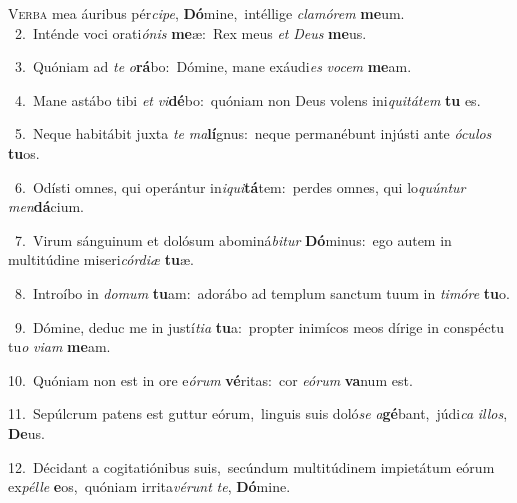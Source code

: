 \lettrine{\initial\textcolor{\initialcolor}{V}}{erba} mea áuribus pér\-\textit{ci}\-\textit{pe}, \textbf{Dó}\-mine,~\star intéllige \textit{cla}\-\textit{mó}\textit{rem} \textbf{me}\-um.\\
{\numbfont\textcolor{\numbcolor}{~2.}}~Inténde voci orati\-\textit{ó}\-\textit{nis} \textbf{me}\-æ:~\star Rex meus \textit{et} \textit{De}\-\textit{us} \textbf{me}\-us.\par
{\numbfont\textcolor{\numbcolor}{~3.}}~Quóniam ad \textit{te} \textit{o}\-\textbf{rá}bo:~\star Dómine, mane exáudi\textit{es} \textit{vo}\-\textit{cem} \textbf{me}\-am.\par
{\numbfont\textcolor{\numbcolor}{~4.}}~Mane astábo tibi \textit{et} \textit{vi}\-\textbf{dé}bo:~\star quóniam non Deus volens ini\-\textit{qui}\-\textit{tá}\textit{tem} \textbf{tu} es.\par
{\numbfont\textcolor{\numbcolor}{~5.}}~Neque habitábit juxta \textit{te} \textit{ma}\-\textbf{lí}gnus:~\star neque permanébunt injústi ante \textit{ó}\-\textit{cu}\textit{los} \textbf{tu}\-os.\par
{\numbfont\textcolor{\numbcolor}{~6.}}~Odísti omnes, qui operántur in\-\textit{i}\-\textit{qui}\textbf{tá}tem:~\star perdes omnes, qui lo\-\textit{quún}\-\textit{tur} \textit{men}\-\textbf{dá}cium.\par
{\numbfont\textcolor{\numbcolor}{~7.}}~Virum sánguinum et dolósum abominá\-\textit{bi}\-\textit{tur} \textbf{Dó}\-minus:~\star ego autem in multitúdine miseri\-\textit{cór}\-\textit{di}\textit{æ} \textbf{tu}\-æ.\par
{\numbfont\textcolor{\numbcolor}{~8.}}~Introíbo in \textit{do}\-\textit{mum} \textbf{tu}\-am:~\star adorábo ad templum sanctum tuum in \textit{ti}\-\textit{mó}\textit{re} \textbf{tu}\-o.\par
{\numbfont\textcolor{\numbcolor}{~9.}}~Dómine, deduc me in justí\-\textit{ti}\-\textit{a} \textbf{tu}\-a:~\star propter inimícos meos dírige in conspéctu tu\textit{o} \textit{vi}\-\textit{am} \textbf{me}\-am.\par
{\numbfont\textcolor{\numbcolor}{10.}}~Quóniam non est in ore e\-\textit{ó}\-\textit{rum} \textbf{vé}\-ritas:~\star cor \textit{e}\-\textit{ó}\textit{rum} \textbf{va}\-num est.\par
{\numbfont\textcolor{\numbcolor}{11.}}~Sepúlcrum patens est guttur eórum,~\dagger linguis suis doló\textit{se} \textit{a}\-\textbf{gé}bant,~\star júdi\textit{ca} \textit{il}\-\textit{los}, \textbf{De}\-us.\par
{\numbfont\textcolor{\numbcolor}{12.}}~Décidant a cogitatiónibus suis,~\dagger secúndum multitúdinem impietátum eórum ex\-\textit{pél}\-\textit{le} \textbf{e}\-os,~\star quóniam irrita\-\textit{vé}\-\textit{runt} \textit{te}\-, \textbf{Dó}\-mine.\par
